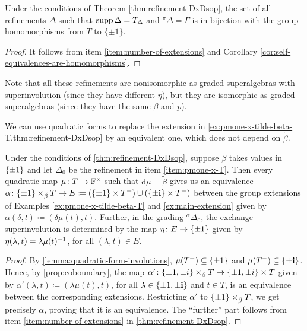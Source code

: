 \begin{cor}\label{cor:old-item-iv}
	Under the conditions of Theorem \ref{thm:refinement-DxDsop}, the set of all refinements $\Delta$ such that $\operatorname{supp} \Delta = T_\Delta$ and ${}^\pi \Delta = \Gamma$ is in bijection with the group homomorphisms from $T$ to $\{ \pm 1 \}$.
\end{cor}

\begin{proof}
	It follows from item \eqref{item:number-of-extensions} and Corollary \ref{cor:self-equivalences-are-homomorphisms}.
\end{proof}

Note that all these refinements are nonisomorphic as graded superalgebras with superinvolution (since they have different $\eta$), but they are isomorphic as graded superalgebras (since they have the same $\beta$ and $p$). 

We can use quadratic forms to replace the extension in \cref{ex:pmone-x-tilde-beta-T,thm:refinement-DxDsop} by an equivalent one, which does not depend on $\tilde\beta$. 

\begin{lemma}\label{lemma:tildeT-finally}
	Under the conditions of \cref{thm:refinement-DxDsop}, suppose $\beta$ takes values in $\{ \pm 1 \}$ and let $\Delta_0$ be the refinement in item \eqref{item:pmone-x-T}. 
    Then every quadratic map $\mu\colon T \to \mathbb{F}^\times$ such that $\mathrm{d}\mu = \tilde\beta$ gives us an equivalence $\alpha\colon \{ \pm 1 \} \times_{\tilde\beta} T \to E \coloneqq (\{ \pm 1 \} \times T^+) \cup (\{ \pm \mathbf{i}\} \times T^-)$ between the group extensions of Examples \ref{ex:pmone-x-tilde-beta-T} and  \ref{ex:main-extension} given by $\alpha(\delta, t) \coloneqq (\delta \mu(t), t)$. 
    Further, in the grading ${}^\alpha \Delta_0$, the exchange superinvolution is determined by the map $\eta\colon E \to \{ \pm 1 \}$ given by $\eta(\lambda, t) = \lambda\mu(t)^{-1}$, for all $(\lambda, t) \in E$. 
\end{lemma}

\begin{proof}
    By \cref{lemma:quadratic-form-involutions}, $\mu(T^+) \subseteq \{ \pm 1 \}$ and $\mu(T^-) \subseteq \{ \pm \mathbf{i} \}$. 
    Hence, by \cref{prop:coboundary}, the map $\alpha'\colon \{ \pm 1, \pm i \} \times_{\tilde\beta} T \to \{ \pm 1, \pm i \} \times T$ given by $\alpha'(\lambda, t) \coloneqq (\lambda\mu(t), t)$, for all $\lambda \in \{ \pm 1, \pm \mathbf{i} \}$ and $t\in T$, is an equivalence between the corresponding extensions. 
    Restricting $\alpha'$ to $\{ \pm 1 \} \times_{\tilde\beta} T$, we get precisely $\alpha$, proving that it is an equivalence. 
    The ``further'' part follows from item \eqref{item:number-of-extensions} in \cref{thm:refinement-DxDsop}. 
\end{proof}

